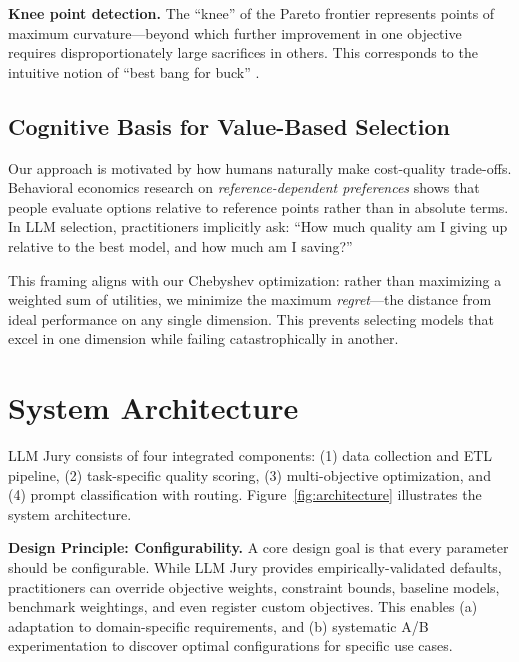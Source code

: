 \documentclass[11pt,a4paper]{article}
\begin{document}
\textbf{Knee point detection.} The ``knee'' of the Pareto frontier represents points of maximum curvature---beyond which further improvement in one objective requires disproportionately large sacrifices in others. This corresponds to the intuitive notion of ``best bang for buck'' \cite{branke2004finding}.

\subsection{Cognitive Basis for Value-Based Selection}

Our approach is motivated by how humans naturally make cost-quality trade-offs. Behavioral economics research on \textit{reference-dependent preferences} \cite{kahneman1979prospect} shows that people evaluate options relative to reference points rather than in absolute terms. In LLM selection, practitioners implicitly ask: ``How much quality am I giving up relative to the best model, and how much am I saving?''

This framing aligns with our Chebyshev optimization: rather than maximizing a weighted sum of utilities, we minimize the maximum \textit{regret}---the distance from ideal performance on any single dimension. This prevents selecting models that excel in one dimension while failing catastrophically in another.


\section{System Architecture}

LLM Jury consists of four integrated components: (1) data collection and ETL pipeline, (2) task-specific quality scoring, (3) multi-objective optimization, and (4) prompt classification with routing. Figure~\ref{fig:architecture} illustrates the system architecture.

\textbf{Design Principle: Configurability.} A core design goal is that every parameter should be configurable. While LLM Jury provides empirically-validated defaults, practitioners can override objective weights, constraint bounds, baseline models, benchmark weightings, and even register custom objectives. This enables (a) adaptation to domain-specific requirements, and (b) systematic A/B experimentation to discover optimal configurations for specific use cases.
\end{document}
